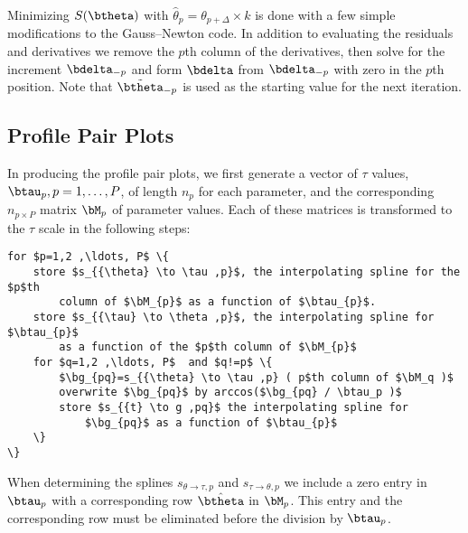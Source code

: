 {Minimizing $S ( \btheta )$ with
$\hat\theta_{p}=\theta_{p+\Delta}\times k$ is done with a few simple
modifications to the Gauss--Newton 
code.  In addition to evaluating the residuals and derivatives we
remove the $p$th column of the derivatives, then solve for the
increment $\bdelta_{-p}$ and form $\bdelta$ from $\bdelta_{-p}$ with
zero in the $p$th position.  Note that $\tilde \btheta_{-p}$ is used
as the starting value for the next iteration.
\subsection{Profile Pair Plots}

In producing the profile pair plots, we first generate a vector of
$\tau$ values, $\btau_{p},p=1 ,\ldots, P$, of length $n_{p}$ for
each parameter, and the corresponding $n_{p\times P}$ matrix $\bM_{p}$
of parameter values.  Each of these matrices is transformed to the
$\tau$ scale in the following steps:
\begin{verbatim}
for $p=1,2 ,\ldots, P$ \{
    store $s_{{\theta} \to \tau ,p}$, the interpolating spline for the $p$th
        column of $\bM_{p}$ as a function of $\btau_{p}$.
    store $s_{{\tau} \to \theta ,p}$, the interpolating spline for $\btau_{p}$
        as a function of the $p$th column of $\bM_{p}$
    for $q=1,2 ,\ldots, P$  and $q!=p$ \{
        $\bg_{pq}=s_{{\theta} \to \tau ,p} ( p$th column of $\bM_q )$
        overwrite $\bg_{pq}$ by arccos($\bg_{pq} / \btau_p )$
        store $s_{{t} \to g ,pq}$ the interpolating spline for
            $\bg_{pq}$ as a function of $\btau_{p}$
    \}
\}
\end{verbatim}

When determining the splines $s_{{\theta} \to \tau ,p}$ and $s_{{\tau}
\to \theta ,p}$ we include a zero entry in $\btau_{p}$ with a
corresponding row $\hat \btheta$ in $\bM_{p}$.  This entry and the
corresponding row must be eliminated before the division by $\btau_{p}$.

}
